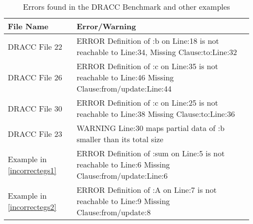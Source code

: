 \begin{table}
    \caption{Errors found in the DRACC Benchmark and other examples}
    \label{dracc-errors}
    \begin{center}
        \scriptsize
        \begin{tabular}{ |m{1.5in} | m{3in} |}
            \hline
           File Name & Error/Warning \\ \hline    
           DRACC File 22  & ERROR Definition of :b on Line:18 is not reachable to Line:34, Missing Clause:to:Line:32 \\ \hline    
           DRACC File 26 & ERROR Definition of :c on Line:35 is not reachable to Line:46 Missing Clause:from/update:Line:44 \\ \hline 
           DRACC File 30 & ERROR Definition of :c on Line:25 is not reachable to Line:38 Missing Clause:to:Line:36 \\ \hline 
           DRACC File 23 & WARNING Line:30 maps partial data of :b smaller than its total size   \\ \hline 
           Example in \autoref{incorrectegs1} & 
           ERROR Definition of :sum on Line:5 is not 
           reachable to Line:6 Missing Clause:from/update:Line:6 \\ \hline  
           Example in \autoref{incorrectegs2} &
           ERROR Definition of :A on Line:7 is not 
           reachable to Line:9 Missing Clause:from/update:8
           \\ \hline                              
        \end{tabular}        
    \end{center}
\end{table} 
\vspace{-20pt}
